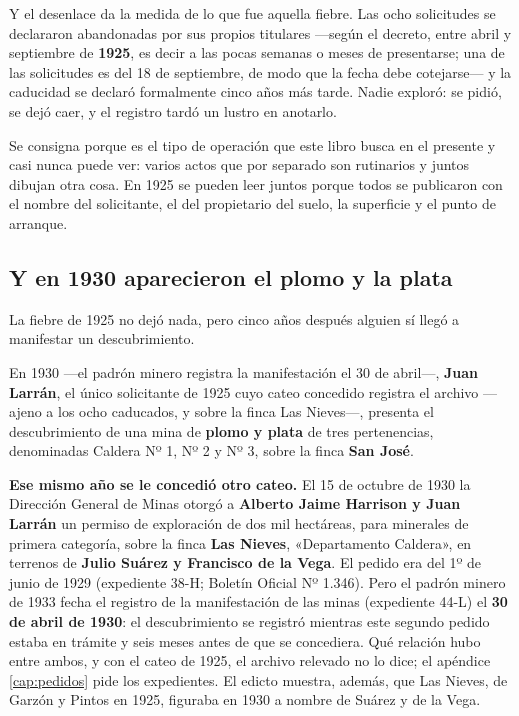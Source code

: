 \begin{cautela}
Y el desenlace da la medida de lo que fue aquella fiebre. Las ocho solicitudes se declararon
abandonadas por sus propios titulares ---según el decreto, entre abril y septiembre de \textbf{1925}, es decir a las pocas semanas o meses de presentarse; una de las solicitudes es del 18 de septiembre, de modo que la fecha debe cotejarse--- y la
caducidad se declaró formalmente cinco años más tarde. Nadie exploró: se pidió, se dejó
caer, y el registro tardó un lustro en anotarlo.

Se consigna porque es el tipo de operación que este libro busca en el presente y casi nunca
puede ver: varios actos que por separado son rutinarios y juntos dibujan otra cosa. En 1925
se pueden leer juntos porque todos se publicaron con el nombre del solicitante, el del
propietario del suelo, la superficie y el punto de arranque.
\end{cautela}

\subsection*{Y en 1930 aparecieron el plomo y la plata}

La fiebre de 1925 no dejó nada, pero cinco años después alguien sí llegó a manifestar un
descubrimiento.

En 1930 ---el padrón minero registra la manifestación el 30 de abril---, \textbf{Juan Larrán}, el único solicitante de 1925 cuyo cateo concedido registra el archivo ---ajeno a
los ocho caducados, y sobre la finca Las Nieves---, presenta el descubrimiento de una
mina de \textbf{plomo y plata} de tres pertenencias, denominadas Caldera Nº 1, Nº 2 y Nº 3, sobre la finca \textbf{San José}.

\textbf{Ese mismo año se le concedió otro cateo.} El 15 de octubre de 1930 la Dirección General de Minas otorgó a \textbf{Alberto Jaime Harrison y Juan Larrán} un permiso de exploración de dos mil hectáreas, para minerales de primera categoría, sobre la finca \textbf{Las Nieves}, «Departamento Caldera», en terrenos de \textbf{Julio Suárez y Francisco de la Vega}. El pedido era del 1º de junio de 1929 (expediente 38-H; Boletín Oficial Nº 1.346). Pero el padrón minero de 1933 fecha el registro de la manifestación de las minas (expediente 44-L) el \textbf{30 de abril de 1930}: el descubrimiento se registró mientras este segundo pedido estaba en trámite y seis meses antes de que se concediera. Qué relación hubo entre ambos, y con el cateo de 1925, el archivo relevado no lo dice; el apéndice \ref{cap:pedidos} pide los expedientes. El edicto muestra, además, que Las Nieves, de Garzón y Pintos en 1925, figuraba en 1930 a nombre de Suárez y de la Vega.

